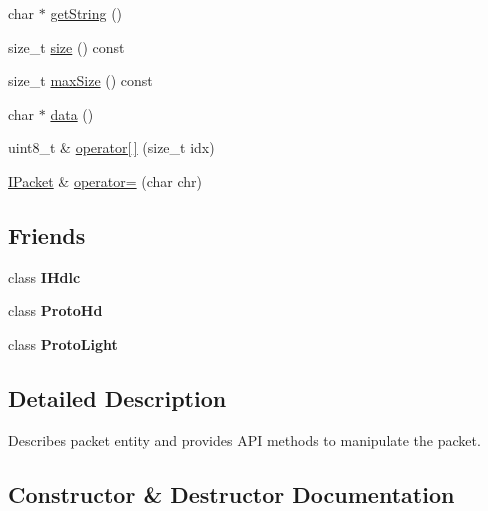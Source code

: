 \begin{DoxyCompactItemize}
char $\ast$ \hyperlink{classTiny_1_1IPacket_ac6e6a22ce9a652954491a8d4db081d79}{get\+String} ()
\item 
size\+\_\+t \hyperlink{classTiny_1_1IPacket_a76b6389f0d47b67c8428c58c2b09df51}{size} () const
\item 
size\+\_\+t \hyperlink{classTiny_1_1IPacket_a0a448d8efe2b6db3ee826f23b184b395}{max\+Size} () const
\item 
char $\ast$ \hyperlink{classTiny_1_1IPacket_aedf2ba31c5a29e3829458bd9f03a7051}{data} ()
\item 
uint8\+\_\+t \& \hyperlink{classTiny_1_1IPacket_aa1d796806e21d1c72a1fc12d2f6db592}{operator\mbox{[}$\,$\mbox{]}} (size\+\_\+t idx)
\item 
\hyperlink{classTiny_1_1IPacket}{I\+Packet} \& \hyperlink{classTiny_1_1IPacket_a215a30775140c2977b7064c91eada17e}{operator=} (char chr)
\end{DoxyCompactItemize}
\subsection*{Friends}
\begin{DoxyCompactItemize}
\item 
\mbox{\label{classTiny_1_1IPacket_acbcf3346413014c93a372add37dc3afc}} 
class {\bfseries I\+Hdlc}
\item 
\mbox{\label{classTiny_1_1IPacket_a7f90e063a34c3417ed1ea25e64608857}} 
class {\bfseries Proto\+Hd}
\item 
\mbox{\label{classTiny_1_1IPacket_a1d317236f2a79fa559d5a9112e555882}} 
class {\bfseries Proto\+Light}
\end{DoxyCompactItemize}


\subsection{Detailed Description}
Describes packet entity and provides A\+PI methods to manipulate the packet. 

\subsection{Constructor \& Destructor Documentation}
\mbox{\label{classTiny_1_1IPacket_af44b18c4c8481475d40d8b87a6cb38ff}} 
